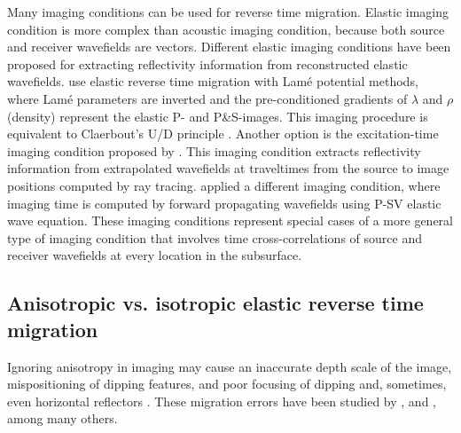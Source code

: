 Many imaging conditions can be used for reverse time migration. 
Elastic imaging condition is more complex than acoustic imaging condition, because both source and receiver wavefields are vectors.
Different elastic imaging conditions have been proposed for extracting reflectivity information from reconstructed elastic wavefields. 
\cite{GEO63-05-16851695} use elastic reverse time migration with Lam\'e potential methods, where Lam\'e parameters are inverted and the pre-conditioned gradients of $\lambda$ and $\rho$ (density) represent the elastic P- and P\&S-images. This imaging procedure is equivalent to Claerbout’s U/D principle \cite[]{GEO36-03-04670481}.
Another option is the excitation-time imaging condition proposed by \cite{chang:67}.  This imaging condition extracts reflectivity information from extrapolated wavefields at traveltimes from the source to image positions computed by ray tracing.
\cite{SEG-1991-1009} applied a different imaging condition, where imaging time is computed by forward propagating wavefields using P-SV elastic wave equation. 
These imaging conditions represent special cases of a more general type of imaging condition that involves time cross-correlations of source and receiver wavefields at every location in the subsurface.







\subsection{Anisotropic vs. isotropic elastic reverse time migration}

Ignoring anisotropy in imaging may cause an inaccurate depth scale of the image, mispositioning of dipping features, and poor focusing of dipping and, sometimes, even horizontal reflectors \cite[]{tsvankin.2001}. These migration errors have been studied by \cite{larner:1454}, \cite{alkhalifah:1405} and \cite{han:2000}, among many others. 


 
